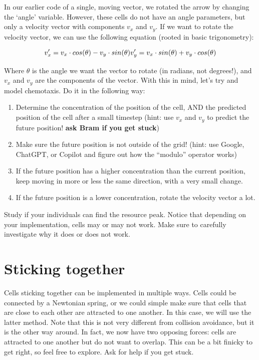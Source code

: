 \documentclass[
  letterpaper,
  DIV=11,
  numbers=noendperiod]{scrreprt}
\providecommand{\tightlist}{%
  \setlength{\itemsep}{0pt}\setlength{\parskip}{0pt}}\usepackage{longtable,booktabs,array}
\theoremstyle{definition}
\theoremstyle{remark}
\begin{document}
In our earlier code of a single, moving vector, we rotated the arrow by
changing the `angle' variable. However, these cells do not have an angle
parameters, but only a velocity vector with components \(v_x\) and
\(v_y\). If we want to rotate the velocity vector, we can use the
following equation (rooted in basic trigonometry):

\[
v_x' = v_x \cdot cos(\theta) - v_y \cdot sin(\theta) \\
v_y' = v_x \cdot sin(\theta) + v_y \cdot cos(\theta)
\]

Where \(\theta\) is the angle we want the vector to rotate (in radians,
not degrees!), and \(v_x\) and \(v_y\) are the components of the vector.
With this in mind, let's try and model chemotaxis. Do it in the
following way:

\begin{enumerate}
\def\labelenumi{\alph{enumi}.}
\tightlist
\item
  Determine the concentration of the position of the cell, AND the
  predicted position of the cell after a small timestep (hint: use
  \(v_x\) and \(v_y\) to predict the future position! \textbf{ask Bram
  if you get stuck})
\item
  Make sure the future position is not outside of the grid! (hint: use
  Google, ChatGPT, or Copilot and figure out how the ``modulo'' operator
  works)
\item
  If the future position has a higher concentration than the current
  position, keep moving in more or less the same direction, with a very
  small change.
\item
  If the future position is a lower concentration, rotate the velocity
  vector a lot.
\end{enumerate}

Study if your individuals can find the resource peak. Notice that
depending on your implementation, cells may or may not work. Make sure
to carefully investigate why it does or does not work.

\section{Sticking together}\label{sec-sticking}

Cells sticking together can be implemented in multiple ways. Cells could
be connected by a Newtonian spring, or we could simple make sure that
cells that are close to each other are attracted to one another. In this
case, we will use the latter method. Note that this is not very
different from collision avoidance, but it is the other way around. In
fact, we now have two opposing forces: cells are attracted to one
another but do not want to overlap. This can be a bit finicky to get
right, so feel free to explore. Ask for help if you get stuck.
\end{document}
